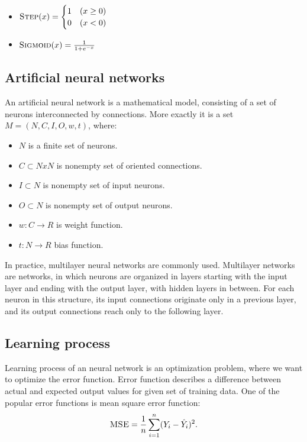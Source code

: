 \begin{itemize}
\item $\textsc{Step}(x)=\begin{cases} 1 & (x \geq 0) \\ 0 & (x < 0) \end{cases}$
\item $\textsc{Sigmoid}(x) = \frac{1}{1+e^{-x}} $
\end{itemize}

\subsection{Artificial neural networks}
An artificial neural network is a mathematical model, consisting of a set of neurons interconnected by connections.
More exactly it is a set 
$M  =  (N,C,I,O,w,t)$,  where:
\begin{itemize}
\item $N$  is  a  finite  set  of  neurons.
\item $C \subset N x N$  is  nonempty  set  of  oriented  connections.
\item $I \subset N$  is  nonempty  set  of  input  neurons.
\item $O \subset N$  is  nonempty  set  of  output  neurons.
\item $w : C \to R$  is  weight  function.
\item $t : N\to R$  bias  function.
\end{itemize}

In practice, multilayer neural networks are commonly used. Multilayer networks are networks, in which  neurons are organized in layers starting with the input layer and ending with the output layer, with hidden layers in between. For each neuron in this structure, its input connections originate only in a  previous layer, and its output connections reach only to the following layer.

\subsection{Learning process}
Learning process of an neural network is an optimization problem, where we want to optimize the error function. Error function describes a difference between actual and expected output values for given set of training data. One of the popular error functions is mean square error function:
\[
\textsc{MSE} = \frac{1}{n} \sum_{i=1}^{n} (Y_{i} - \hat{Y}_{i})^2.
\]

